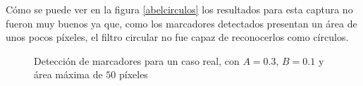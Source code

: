 Cómo se puede ver en la figura \ref{abelcirculos} los resultados para esta captura no fueron muy buenos ya que, como los marcadores detectados presentan un área de unos pocos píxeles, el filtro circular no fue capaz de reconocerlos como círculos.  

\begin{figure}[H]
        \centering
        \hspace{5 mm}
  \caption{Detección de marcadores para un caso real, con $A=0.3$, $B=0.1$ y área máxima de $50$ píxeles}
      \label{ejemploabeldet}
\end{figure}

